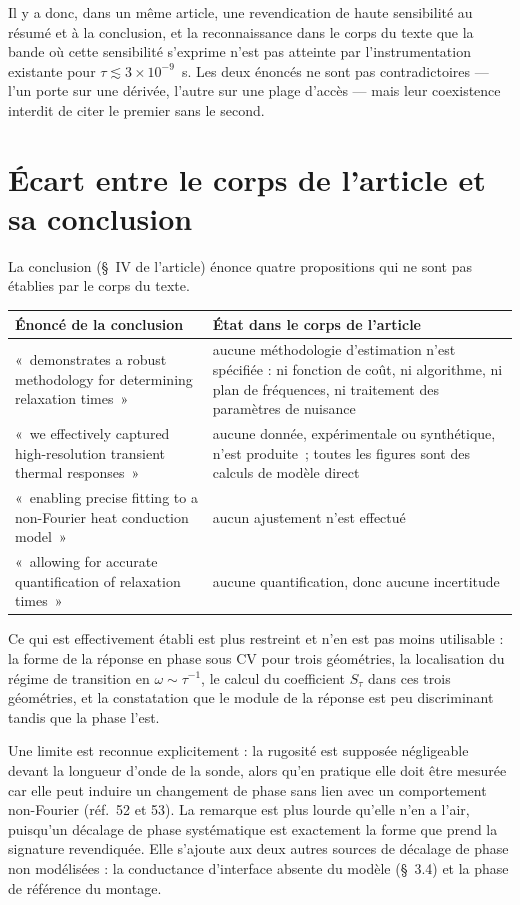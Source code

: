 \documentclass[11pt,a4paper]{article}
\begin{document}
Il y a donc, dans un même article, une revendication de haute sensibilité au résumé et à la
conclusion, et la reconnaissance dans le corps du texte que la bande où cette sensibilité
s'exprime n'est pas atteinte par l'instrumentation existante pour
$\tau \lesssim 3\times10^{-9}$~s. Les deux énoncés ne sont pas contradictoires --- l'un porte
sur une dérivée, l'autre sur une plage d'accès --- mais leur coexistence interdit de citer le
premier sans le second.

\section{Écart entre le corps de l'article et sa conclusion}

La conclusion (§~IV de l'article) énonce quatre propositions qui ne sont pas établies par le
corps du texte.

\smallskip
{\small
\begin{tabularx}{\linewidth}{@{}X X@{}}
\toprule
\textbf{Énoncé de la conclusion} & \textbf{État dans le corps de l'article} \\
\midrule
«~demonstrates a robust methodology for determining relaxation times~» &
aucune méthodologie d'estimation n'est spécifiée : ni fonction de coût, ni algorithme, ni plan
de fréquences, ni traitement des paramètres de nuisance \\
«~we effectively captured high-resolution transient thermal responses~» &
aucune donnée, expérimentale ou synthétique, n'est produite~; toutes les figures sont des
calculs de modèle direct \\
«~enabling precise fitting to a non-Fourier heat conduction model~» &
aucun ajustement n'est effectué \\
«~allowing for accurate quantification of relaxation times~» &
aucune quantification, donc aucune incertitude \\
\bottomrule
\end{tabularx}}

\smallskip
Ce qui est effectivement établi est plus restreint et n'en est pas moins utilisable : la forme
de la réponse en phase sous CV pour trois géométries, la localisation du régime de transition en
$\omega \sim \tau^{-1}$, le calcul du coefficient $S_\tau$ dans ces trois géométries, et la
constatation que le module de la réponse est peu discriminant tandis que la phase l'est.

Une limite est reconnue explicitement : la rugosité est supposée négligeable devant la longueur
d'onde de la sonde, alors qu'en pratique elle doit être mesurée car elle peut induire un
changement de phase sans lien avec un comportement non-Fourier (réf.~52 et 53). La remarque est
plus lourde qu'elle n'en a l'air, puisqu'un décalage de phase systématique est exactement la
forme que prend la signature revendiquée. Elle s'ajoute aux deux autres sources de décalage de
phase non modélisées : la conductance d'interface absente du modèle (§~3.4) et la phase de
référence du montage.
\end{document}
